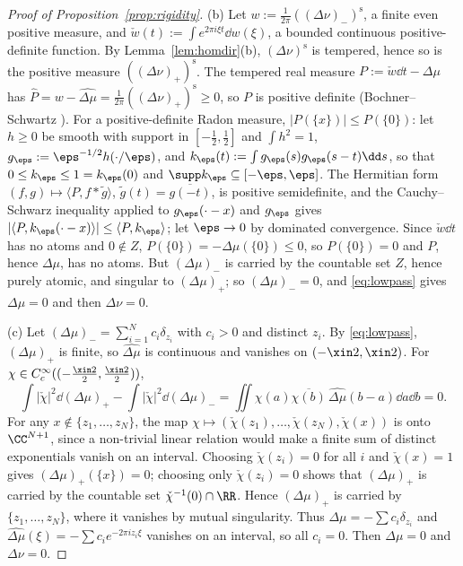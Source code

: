 \begin{proof}[Proof of Proposition~\textup{\ref{prop:rigidity}}]
(b) Let $w:=\frac1{2\pi}((\Delta\nu)_-)^{\mathrm s}$, a finite even positive measure, and $\check w(t):=\int e^{2\pi i\xi t}\dd w(\xi)$, a
bounded continuous positive-definite function. By Lemma~\ref{lem:homdir}(b), $(\Delta\nu)^{\mathrm s}$ is tempered, hence so is
the positive measure $((\Delta\nu)_+)^{\mathrm s}$. The tempered real measure $P:=\check w\dd t-\Delta\mu$ has
$\widehat P=w-\widehat{\Delta\mu}=\frac1{2\pi}((\Delta\nu)_+)^{\mathrm s}\ge0$, so $P$ is positive definite (Bochner--Schwartz
\cite[Ch.~II, \S3]{GV64}). For a positive-definite Radon measure, $|P(\{x\})|\le P(\{0\})$: let
$h\ge0$ be smooth with support in $[-\frac12,\frac12]$ and $\int h^2=1$, $g_\eps:=\eps^{-1/2}h(\cdot/\eps)$, and
$k_\eps(t):=\int g_\eps(s)g_\eps(s-t)\dd s$, so that $0\le k_\eps\le1=k_\eps(0)$ and $\supp k_\eps\subseteq[-\eps,\eps]$. The Hermitian
form $(f,g)\mapsto\langle P,f*\tilde g\rangle$, $\tilde g(t)=\overline{g(-t)}$, is positive semidefinite, and the Cauchy--Schwarz
inequality applied to $g_\eps(\cdot-x)$ and $g_\eps$ gives $|\langle P,k_\eps(\cdot-x)\rangle|\le\langle P,k_\eps\rangle$; let
$\eps\to0$ by dominated convergence. Since $\check w\dd t$ has no atoms and $0\notin Z$, $P(\{0\})=-\Delta\mu(\{0\})\le0$, so
$P(\{0\})=0$ and $P$, hence $\Delta\mu$, has no atoms. But $(\Delta\mu)_-$ is carried by the countable set $Z$, hence purely atomic, and
singular to $(\Delta\mu)_+$; so $(\Delta\mu)_-=0$, and \eqref{eq:lowpass} gives $\Delta\mu=0$ and then $\Delta\nu=0$.

(c) Let $(\Delta\mu)_-=\sum_{i=1}^Nc_i\delta_{z_i}$ with $c_i>0$ and distinct $z_i$. By \eqref{eq:lowpass}, $(\Delta\mu)_+$ is finite, so
$\widehat{\Delta\mu}$ is continuous and vanishes on $(-\xin2,\xin2)$. For $\chi\in C_c^\infty((-\frac{\xin2}2,\frac{\xin2}2))$,
\[
\int|\check\chi|^2\dd(\Delta\mu)_+-\int|\check\chi|^2\dd(\Delta\mu)_-=\iint\chi(a)\overline{\chi(b)}\,\widehat{\Delta\mu}(b-a)\dd a\dd b=0 .
\]
For any $x\notin\{z_1,\dots,z_N\}$, the map $\chi\mapsto(\check\chi(z_1),\dots,\check\chi(z_N),\check\chi(x))$ is onto $\CC^{N+1}$, since a
non-trivial linear relation would make a finite sum of distinct exponentials vanish on an interval. Choosing $\check\chi(z_i)=0$
for all $i$ and $\check\chi(x)=1$ gives $(\Delta\mu)_+(\{x\})=0$; choosing only $\check\chi(z_i)=0$ shows that $(\Delta\mu)_+$ is carried by
the countable set $\check\chi^{-1}(0)\cap\RR$. Hence $(\Delta\mu)_+$ is carried by $\{z_1,\dots,z_N\}$, where it vanishes by mutual
singularity. Thus $\Delta\mu=-\sum c_i\delta_{z_i}$ and $\widehat{\Delta\mu}(\xi)=-\sum c_ie^{-2\pi iz_i\xi}$ vanishes on an interval, so
all $c_i=0$. Then $\Delta\mu=0$ and $\Delta\nu=0$.
\end{proof}

